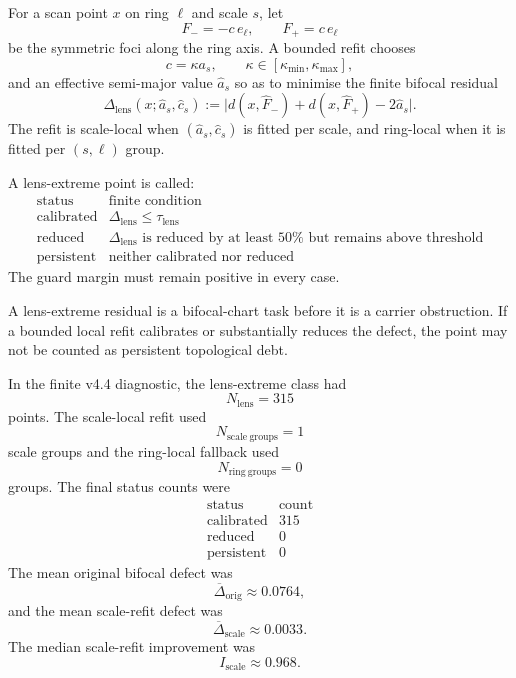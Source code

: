 \begin{definition}
For a scan point \(x\) on ring \(\ell\) and scale \(s\), let
\[
    F_-=-c\,e_\ell,\qquad F_+=c\,e_\ell
\]
be the symmetric foci along the ring axis.  A bounded refit chooses
\[
    c=\kappa a_s,\qquad \kappa\in[\kappa_{\min},\kappa_{\max}],
\]
and an effective semi-major value \(\widehat a_s\) so as to minimise the finite
bifocal residual
\[
    \Delta_{\mathrm{lens}}(x;\widehat a_s,\widehat c_s)
    :=
    \bigl|d(x,\widehat F_-)+d(x,\widehat F_+)-2\widehat a_s\bigr|.
\]
The refit is scale-local when \((\widehat a_s,\widehat c_s)\) is fitted per
scale, and ring-local when it is fitted per \((s,\ell)\) group.
\end{definition}

\begin{definition}
A lens-extreme point is called:
\[
\begin{array}{c|l}
\text{status} & \text{finite condition}\\
\hline
\mathrm{calibrated} &
\Delta_{\mathrm{lens}}\leq \tau_{\mathrm{lens}}\\
\mathrm{reduced} &
\Delta_{\mathrm{lens}}\text{ is reduced by at least }50\%\text{ but remains above threshold}\\
\mathrm{persistent} &
\text{neither calibrated nor reduced}
\end{array}
\]
The guard margin must remain positive in every case.
\end{definition}

\begin{proposition}
A lens-extreme residual is a bifocal-chart task before it is a carrier
obstruction.  If a bounded local refit calibrates or substantially reduces the
defect, the point may not be counted as persistent topological debt.
\end{proposition}

\begin{remark}
In the finite v4.4 diagnostic, the lens-extreme class had
\[
    N_{\mathrm{lens}}=315
\]
points.  The scale-local refit used
\[
    N_{\mathrm{scale\ groups}}=1
\]
scale groups and the ring-local fallback used
\[
    N_{\mathrm{ring\ groups}}=0
\]
groups.  The final status counts were
\[
\begin{array}{c|r}
\text{status} & \text{count}\\
\hline
\mathrm{calibrated} & 315\\
\mathrm{reduced} & 0\\
\mathrm{persistent} & 0
\end{array}
\]
The mean original bifocal defect was
\[
    \overline{\Delta}_{\mathrm{orig}}\approx 0.0764,
\]
and the mean scale-refit defect was
\[
    \overline{\Delta}_{\mathrm{scale}}\approx 0.0033.
\]
The median scale-refit improvement was
\[
    I_{\mathrm{scale}}\approx 0.968.
\]
\end{remark}

